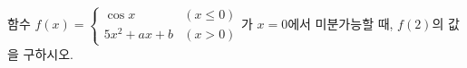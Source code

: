 함수 $f(x)=\begin{cases} \cos x & (x\le 0) \\ 5x^2+ax+b & (x>0) \end{cases}$가 $x=0$에서 미분가능할 때, $f(2)$의 값을 구하시오. 

